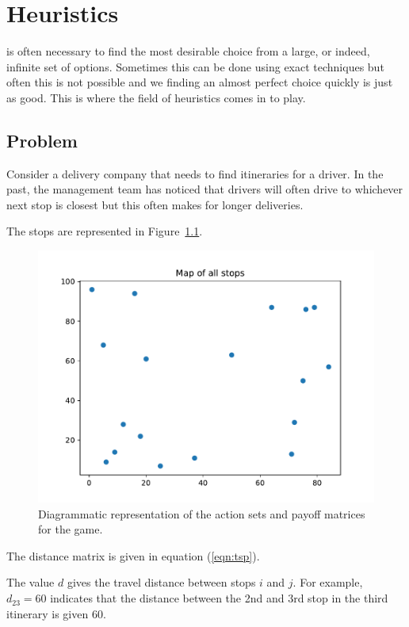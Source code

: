 \chapter[Heuristics]{Heuristics}

 is often necessary to find the most desirable choice from
a large, or indeed, infinite set of options. Sometimes this can be done using
exact techniques but often this is not possible and we finding an almost perfect
choice quickly is just as good. This is where the field of heuristics comes in
to play.

\section{Problem}\label{sec:problem}

Consider a delivery company that needs to find itineraries for a driver. In
the past, the management team has noticed that drivers will often drive to
whichever next stop is closest but this often makes for longer deliveries.

The stops are represented in Figure~\ref{fig:tsp}.

\begin{figure}
\begin{center}
\includegraphics[width=.8\textwidth]{./assets/tsp/main.pdf}
\end{center}
\caption{Diagrammatic representation of the action sets and payoff matrices for
    the game.}
\label{fig:tsp}
\end{figure}

The distance matrix is given in equation (\ref{eqn:tsp}).

\tiny{
    
}
\normalsize

The value \(d\) gives the travel distance between
stops \(i\) and \(j\). For example, \(d_{23}=60\) %
indicates that the distance between the 2nd and 3rd stop in the third itinerary
is given 60. %

